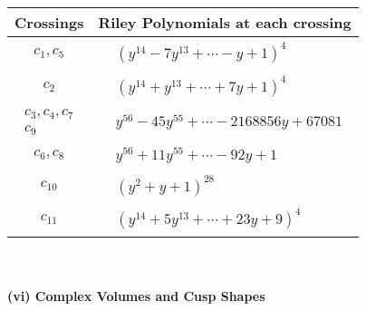 \documentclass[1p]{elsarticle_modified}
\theoremstyle{definition}
\begin{document}
\begin{tabular}{m{50pt}|m{274pt}}
Crossings & \hspace{64pt}Riley Polynomials at each crossing \\
\hline $$\begin{aligned}c_{1},c_{5}\end{aligned}$$&$\begin{aligned}
&(y^{14}-7 y^{13}+\cdots- y+1)^{4}
\end{aligned}$\\
\hline $$\begin{aligned}c_{2}\end{aligned}$$&$\begin{aligned}
&(y^{14}+y^{13}+\cdots+7 y+1)^{4}
\end{aligned}$\\
\hline $$\begin{aligned}c_{3},c_{4},c_{7}\\c_{9}\end{aligned}$$&$\begin{aligned}
&y^{56}-45 y^{55}+\cdots-2168856 y+67081
\end{aligned}$\\
\hline $$\begin{aligned}c_{6},c_{8}\end{aligned}$$&$\begin{aligned}
&y^{56}+11 y^{55}+\cdots-92 y+1
\end{aligned}$\\
\hline $$\begin{aligned}c_{10}\end{aligned}$$&$\begin{aligned}
&(y^2+y+1)^{28}
\end{aligned}$\\
\hline $$\begin{aligned}c_{11}\end{aligned}$$&$\begin{aligned}
&(y^{14}+5 y^{13}+\cdots+23 y+9)^{4}
\end{aligned}$\\
\hline
\end{tabular}\\~\\
\newpage\flushleft \textbf{(vi) Complex Volumes and Cusp Shapes}
\end{document}
